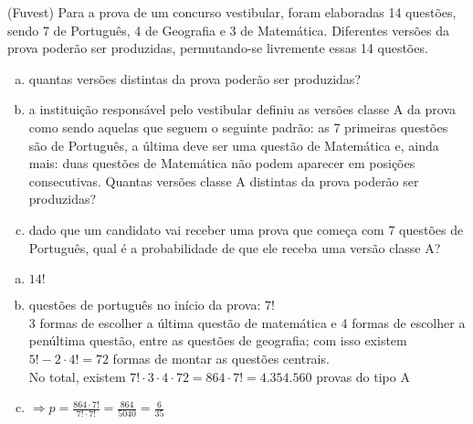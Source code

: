 \begin{ex}
  (Fuvest) Para a prova de um concurso vestibular, foram elaboradas 14 questões, sendo 7 de Português, 4 de Geografia e 3 de Matemática. Diferentes versões da prova poderão ser produzidas, permutando-se livremente essas 14 questões.
    \begin{enumerate}  [(a)]
        \item quantas versões distintas da prova poderão ser produzidas?
        \item a instituição responsável pelo vestibular definiu as versões classe A da prova como sendo aquelas que seguem o seguinte padrão: as 7 primeiras questões são de Português, a última deve ser uma questão de Matemática e, ainda mais: duas questões de Matemática não podem aparecer em posições consecutivas. Quantas versões classe A distintas da prova poderão ser produzidas?
        \item dado que um candidato vai receber uma prova que começa com 7 questões de Português, qual é a probabilidade de que ele receba uma versão classe A?
    \end{enumerate}
      \begin{sol}
       \phantom{A} 
       \begin{enumerate} [(a)]
           \item $14!$
           \item questões de português no início da prova: $7!$\\
           3 formas de escolher a última questão de matemática e 4 formas de escolher a penúltima questão, entre as questões de geografia; com isso existem $5!-2\cdot4!=72$ formas de montar as questões centrais.\\
           No total, existem $7!\cdot3\cdot4\cdot72=864\cdot7!= 4.354.560$ provas do tipo A
           \item $\Longrightarrow p=\frac{864\cdot7!}{7!\cdot7!}=\frac{864}{5040}=\frac{6}{35}$
       \end{enumerate}
      \end{sol}
 \end{ex}